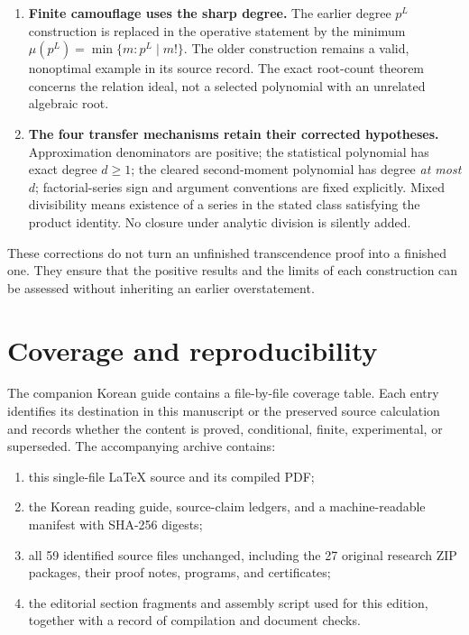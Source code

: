 \documentclass[11pt,a4paper]{article}
\theoremstyle{definition}
\theoremstyle{remark}
\numberwithin{equation}{section}
\begin{document}
\begin{enumerate}[leftmargin=*,itemsep=6pt]
\item \textbf{Finite camouflage uses the sharp degree.}
The earlier degree $p^L$ construction is replaced in the operative
statement by the minimum $\mu(p^L)=\min\{m:p^L\mid m!\}$.
The older construction remains a valid, nonoptimal example in its source
record. The exact root-count theorem concerns the relation ideal, not a
selected polynomial with an unrelated algebraic root.

\item \textbf{The four transfer mechanisms retain their corrected
hypotheses.}
Approximation denominators are positive; the statistical polynomial has
exact degree $d\ge1$; the cleared second-moment polynomial has degree
\emph{at most} $d$; factorial-series sign and argument conventions are
fixed explicitly. Mixed divisibility means existence of a series in the
stated class satisfying the product identity. No closure under analytic
division is silently added.
\end{enumerate}

These corrections do not turn an unfinished transcendence proof into a
finished one. They ensure that the positive results and the limits of each
construction can be assessed without inheriting an earlier overstatement.

\section{Coverage and reproducibility}
\label{master:coverage}

The companion Korean guide contains a file-by-file coverage table. Each
entry identifies its destination in this manuscript or the preserved
source calculation and records whether the content is proved, conditional,
finite, experimental, or superseded. The accompanying archive contains:
\begin{enumerate}[leftmargin=*]
\item this single-file LaTeX source and its compiled PDF;
\item the Korean reading guide, source-claim ledgers, and a machine-readable
manifest with SHA-256 digests;
\item all 59 identified source files unchanged, including the 27 original
research ZIP packages, their proof notes, programs, and certificates;
\item the editorial section fragments and assembly script used for this
edition, together with a record of compilation and document checks.
\end{enumerate}
\end{document}
